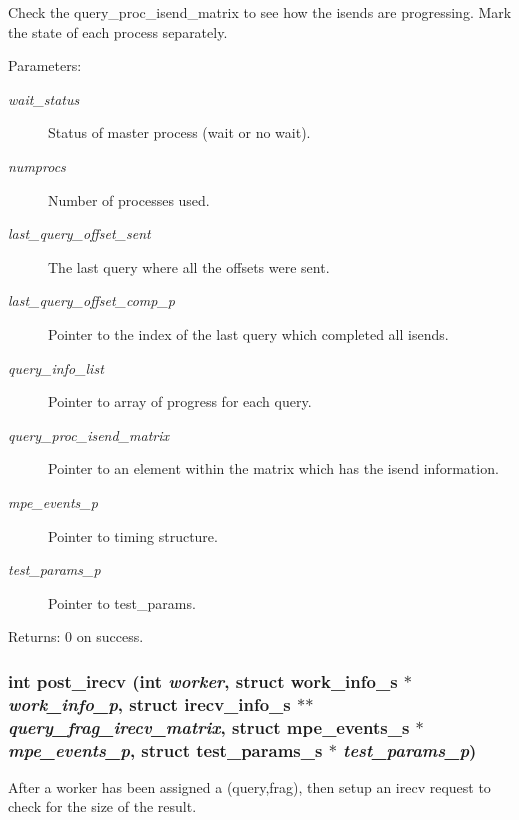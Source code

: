 Check the query\_\-proc\_\-isend\_\-matrix to see how the isends are progressing. Mark the state of each process separately.

\begin{Desc}
\item[Parameters:]
\begin{description}
\item[{\em wait\_\-status}]Status of master process (wait or no wait). \item[{\em numprocs}]Number of processes used. \item[{\em last\_\-query\_\-offset\_\-sent}]The last query where all the offsets were sent. \item[{\em last\_\-query\_\-offset\_\-comp\_\-p}]Pointer to the index of the last query which completed all isends. \item[{\em query\_\-info\_\-list}]Pointer to array of progress for each query. \item[{\em query\_\-proc\_\-isend\_\-matrix}]Pointer to an element within the matrix which has the isend information. \item[{\em mpe\_\-events\_\-p}]Pointer to timing structure. \item[{\em test\_\-params\_\-p}]Pointer to test\_\-params. \end{description}
\end{Desc}
\begin{Desc}
\item[Returns:]0 on success. \end{Desc}
\subsubsection{\setlength{\rightskip}{0pt plus 5cm}int post\_\-irecv (int {\em worker}, struct \bf{work\_\-info\_\-s} $\ast$ {\em work\_\-info\_\-p}, struct \bf{irecv\_\-info\_\-s} $\ast$$\ast$ {\em query\_\-frag\_\-irecv\_\-matrix}, struct \bf{mpe\_\-events\_\-s} $\ast$ {\em mpe\_\-events\_\-p}, struct \bf{test\_\-params\_\-s} $\ast$ {\em test\_\-params\_\-p})}\label{master__help_8h_3907598dcc26cd2eac68061480abb332}


After a worker has been assigned a (query,frag), then setup an irecv request to check for the size of the result.

